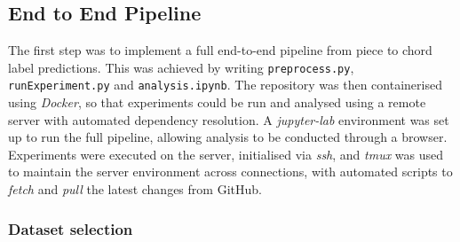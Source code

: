 \documentclass[12pt,a4paper,twoside,openright]{report}
\DeclareMathOperator*{\argmax}{arg\,max}
\theoremstyle{definition}
\begin{document}
%
%
%
%
%
%


\subsection{End to End Pipeline}
The first step was to implement a full end-to-end pipeline from piece to chord label predictions.
This was achieved by writing \texttt{preprocess.py}, \texttt{runExperiment.py} and \texttt{analysis.ipynb}. 
The repository was then containerised using \textit{Docker}, so that experiments could be run and analysed using a remote server with automated dependency resolution.
A \textit{jupyter-lab} environment was set up to run the full pipeline, allowing analysis to be conducted through a browser. 
Experiments were executed on the server, initialised via \textit{ssh}, and \textit{tmux} was used to maintain the server environment across connections, with automated scripts to \textit{fetch} and \textit{pull} the latest changes from GitHub.

\subsubsection{Dataset selection}
\end{document}
